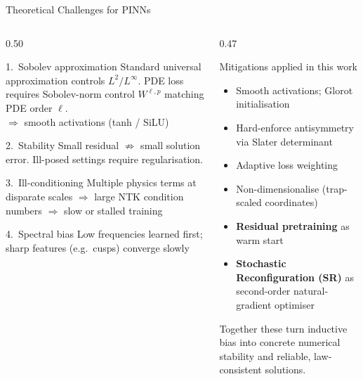 \documentclass[aspectratio=169,10pt]{beamer}
\begin{document}
\begin{frame}{Theoretical Challenges for PINNs}
  \begin{columns}[T]
    \begin{column}{0.50\textwidth}
      \begin{alertblock}{1.\ Sobolev approximation}
        Standard universal approximation controls $L^2/L^\infty$.
        PDE loss requires Sobolev-norm control $W^{\ell,p}$ matching
        PDE order $\ell$.\\
        $\Rightarrow$ smooth activations (tanh / SiLU)
      \end{alertblock}
      \vspace{4pt}
      \begin{alertblock}{2.\ Stability}
        Small residual $\not\Rightarrow$ small solution error.
        Ill-posed settings require regularisation.
      \end{alertblock}
      \vspace{4pt}
      \begin{alertblock}{3.\ Ill-conditioning}
        Multiple physics terms at disparate scales
        $\Rightarrow$ large NTK condition numbers
        $\Rightarrow$ slow or stalled training
      \end{alertblock}
      \vspace{4pt}
      \begin{alertblock}{4.\ Spectral bias}
        Low frequencies learned first;
        sharp features (e.g.\ cusps) converge slowly
      \end{alertblock}
    \end{column}
    \begin{column}{0.47\textwidth}
      \begin{block}{Mitigations applied in this work}
        \begin{itemize}
          \item Smooth activations; Glorot initialisation
          \item Hard-enforce antisymmetry via Slater determinant
          \item Adaptive loss weighting
          \item Non-dimensionalise (trap-scaled coordinates)
          \item \textbf{Residual pretraining} as warm start
          \item \textbf{Stochastic Reconfiguration (SR)} as
                second-order natural-gradient optimiser
        \end{itemize}
      \end{block}
      \medskip
      \small\textcolor{uioblue}{Together these turn inductive bias
        into concrete numerical stability and
        reliable, law-consistent solutions.}
    \end{column}
  \end{columns}
\end{frame}
\end{document}
